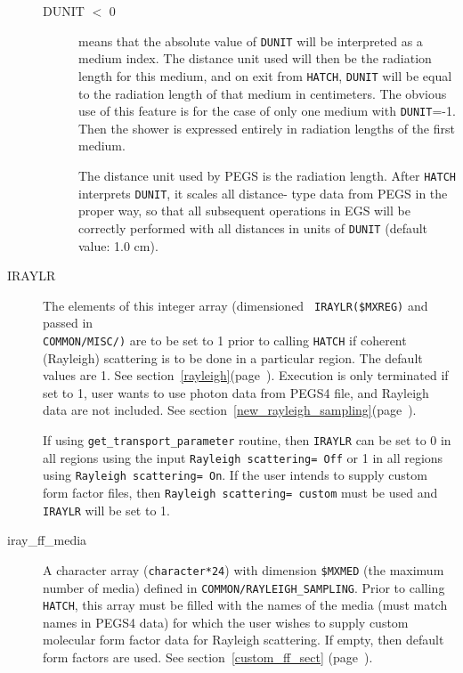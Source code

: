 \begin{description}
\begin{description}
 \item[DUNIT $<$ 0] means that the absolute value of {\tt DUNIT} will be
interpreted as a medium index.  The distance unit used will then be the
radiation length for this medium, and on exit from {\tt HATCH}, {\tt DUNIT} will be
equal to the radiation length of that medium in centimeters.  The obvious
use of this feature is for the case of only one medium with {\tt DUNIT}=-1.  Then
the shower is expressed entirely in radiation lengths of the first medium.


The distance unit used by PEGS is the radiation length.  After {\tt HATCH}
interprets {\tt DUNIT}, it scales all distance- type data from PEGS in the proper
way, so that all subsequent operations in EGS will be correctly performed
with all distances in units of {\tt DUNIT} (default value: 1.0 cm).
\end{description}


\item[IRAYLR] The elements of this integer array (dimensioned {\tt
IRAYLR(\$MXREG)} and passed in\\ {\tt COMMON/MISC/)} are to be set to 1
prior to calling {\tt HATCH} if coherent (Rayleigh) scattering is to be done
in a particular region. The default values are 1.
See section~\ref{rayleigh}(page~\pageref{rayleigh}).
Execution is only terminated if set to 1, user wants to use photon data
from PEGS4 file, and Rayleigh data are not included.
See section~\ref{new_rayleigh_sampling}(page~\pageref{new_rayleigh_sampling}).

If using {\tt get\_transport\_parameter} routine, then {\tt IRAYLR} can
be set to 0 in all regions using the input {\tt Rayleigh scattering= Off}
or 1 in all regions using {\tt Rayleigh scattering= On}. If the user
intends to supply custom form factor files, then
{\tt Rayleigh scattering= custom} must be used and {\tt IRAYLR} will
be set to 1.

\item[iray\_ff\_media] A character array ({\tt character*24}) with
dimension {\tt \$MXMED} (the maximum number of media) defined in
{\tt COMMON/RAYLEIGH\_SAMPLING}.  Prior
to calling {\tt HATCH}, this array must be filled with the
names of the media (must match names in PEGS4 data) for which the user
wishes to supply custom molecular form factor data for Rayleigh
scattering.  If empty, then default form factors are used.
See section~\ref{custom_ff_sect} (page~\pageref{custom_ff_sect}).


\end{description}
